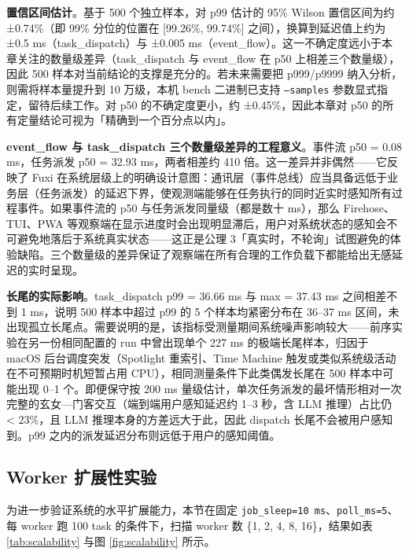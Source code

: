 \textbf{置信区间估计}。基于 500 个独立样本，对 p99 估计的 95\% Wilson 置信区间为约 ±0.74\%（即 99\% 分位的位置在 [99.26\%, 99.74\%] 之间），换算到延迟值上约为 ±0.5 ms（task\_dispatch）与 ±0.005 ms（event\_flow）。这一不确定度远小于本章关注的数量级差异（task\_dispatch 与 event\_flow 在 p50 上相差三个数量级），因此 500 样本对当前结论的支撑是充分的。若未来需要把 p999/p9999 纳入分析，则需将样本量提升到 10 万级，本机 bench 二进制已支持 \texttt{--samples} 参数显式指定，留待后续工作。对 p50 的不确定度更小，约 ±0.45\%，因此本章对 p50 的所有定量结论可视为「精确到一个百分点以内」。

\textbf{event\_flow 与 task\_dispatch 三个数量级差异的工程意义}。事件流 p50 = 0.08 ms，任务派发 p50 = 32.93 ms，两者相差约 410 倍。这一差异并非偶然——它反映了 Fuxi 在系统层级上的明确设计意图：通讯层（事件总线）应当具备远低于业务层（任务派发）的延迟下界，使观测端能够在任务执行的同时近实时感知所有过程事件。如果事件流的 p50 与任务派发同量级（都是数十 ms），那么 Firehose、TUI、PWA 等观察端在显示进度时会出现明显滞后，用户对系统状态的感知会不可避免地落后于系统真实状态——这正是公理 3「真实时，不轮询」试图避免的体验缺陷。三个数量级的差异保证了观察端在所有合理的工作负载下都能给出无感延迟的实时呈现。

\textbf{长尾的实际影响}。task\_dispatch p99 = 36.66 ms 与 max = 37.43 ms 之间相差不到 1 ms，说明 500 样本中超过 p99 的 5 个样本均紧密分布在 36--37 ms 区间，未出现孤立长尾点。需要说明的是，该指标受测量期间系统噪声影响较大——前序实验在另一份相同配置的 run 中曾出现单个 227 ms 的极端长尾样本，归因于 macOS 后台调度突发（Spotlight 重索引、Time Machine 触发或类似系统级活动在不可预期时机短暂占用 CPU），相同测量条件下此类偶发长尾在 500 样本中可能出现 0--1 个。即便保守按 200 ms 量级估计，单次任务派发的最坏情形相对一次完整的玄女—门客交互（端到端用户感知延迟约 1--3 秒，含 LLM 推理）占比仍 < 23\%，且 LLM 推理本身的方差远大于此，因此 dispatch 长尾不会被用户感知到。p99 之内的派发延迟分布则远低于用户的感知阈值。

\subsection{Worker 扩展性实验}

为进一步验证系统的水平扩展能力，本节在固定 \texttt{job\_sleep=10 ms}、\texttt{poll\_ms=5}、每 worker 跑 100 task 的条件下，扫描 worker 数 \{1, 2, 4, 8, 16\}，结果如表 \ref{tab:scalability} 与图 \ref{fig:scalability} 所示。

